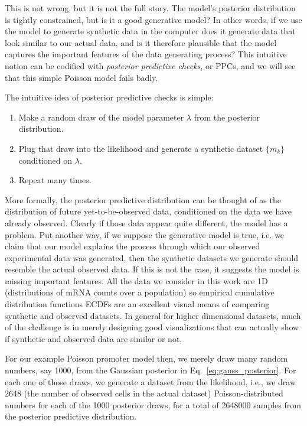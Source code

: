 This is not wrong, but it is not the full story. The model's posterior
distribution is tightly constrained, but is it a good generative model? In other
words, if we use the model to generate synthetic data in the computer does it
generate data that look similar to our actual data, and is it therefore
plausible that the model captures the important features of the data generating
process? This intuitive notion can be codified with \textit{posterior predictive
checks}, or PPCs, and we will see that this simple Poisson model fails badly.

The intuitive idea of posterior predictive checks is simple: 
\begin{enumerate}
\item Make a random draw of the model parameter $\lambda$ from the posterior
distribution.
\item Plug that draw into the likelihood and generate a synthetic dataset
$\{m_k\}$ conditioned on $\lambda$.
\item Repeat many times.
\end{enumerate}
More formally, the posterior predictive distribution can be thought of as the
distribution of future yet-to-be-observed data, conditioned on the data we have
already observed. Clearly if those data appear quite different, the model has a
problem. Put another way, if we suppose the generative model is true, i.e. we
claim that our model explains the process through which our observed
experimental data was generated, then the synthetic datasets we generate should
resemble the actual observed data. If this is not the case, it suggests the
model is missing important features. All the data we consider in this work are
1D (distributions of mRNA counts over a population) so empirical cumulative
distribution functions ECDFs are an excellent visual means of comparing
synthetic and observed datasets. In general for higher dimensional datasets,
much of the challenge is in merely designing good visualizations that can
actually show if synthetic and observed data are similar or not.

For our example Poisson promoter model then, we merely draw many random numbers,
say 1000, from the Gaussian posterior in Eq.~\ref{eq:gauss_posterior}. For each
one of those draws, we generate a dataset from the likelihood, i.e., we draw
2648 (the number of observed cells in the actual dataset) Poisson-distributed
numbers for each of the 1000 posterior draws, for a total of 2648000 samples
from the posterior predictive distribution.

